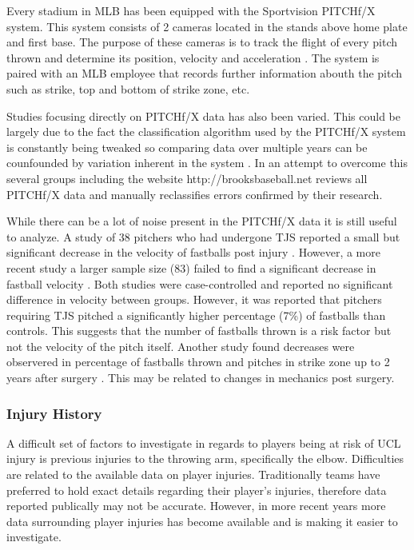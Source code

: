 Every stadium in MLB has been equipped with the Sportvision PITCHf/X system. This system consists of 2 cameras located in the stands above home plate and first base. The purpose of these cameras is to track the flight of every pitch thrown and determine its position, velocity and acceleration \cite{Fast2010}. The system is paired with an MLB employee that records further information abouth the pitch such as strike, top and bottom of strike zone, etc.

Studies focusing directly on PITCHf/X data has also been varied. This could be largely due to the fact the classification algorithm used by the PITCHf/X system is constantly being tweaked so comparing data over multiple years can be counfounded by variation inherent in the system \cite{Fast2010}. In an attempt to overcome this several groups including the website http://brooksbaseball.net reviews all PITCHf/X data and manually reclassifies errors confirmed by their research.

While there can be a lot of noise present in the PITCHf/X data it is still useful to analyze. A study of 38 pitchers who had undergone TJS reported a small but significant decrease in the velocity of fastballs post injury \cite{Jiang2014}. However, a more recent study a larger sample size (83) failed to find a significant decrease in fastball velocity \cite{Keller2016}. Both studies were case-controlled and reported no significant difference in velocity between groups. However, it was reported that pitchers requiring TJS pitched a significantly higher percentage (7\%) of fastballs than controls. This suggests that the number of fastballs thrown is a risk factor but not the velocity of the pitch itself. \cite{Keller2016} Another study found decreases were observered in percentage of fastballs thrown and pitches in strike zone up to 2 years after surgery \cite{Makhni2014}. This may be related to changes in mechanics post surgery.

\subsubsection{Injury History}
A difficult set of factors to investigate in regards to players being at risk of UCL injury is previous injuries to the throwing arm, specifically the elbow. Difficulties are related to the available data on player injuries. Traditionally teams have preferred to hold exact details regarding their player's injuries, therefore data reported publically may not be accurate. However, in more recent years more data surrounding player injuries has become available and is making it easier to investigate.

